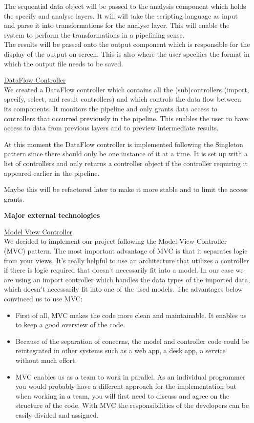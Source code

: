 \documentclass[a4paper,english,fleqn]{exam}
\begin{document}
The sequential data object will be passed to the analysis component which holds the specify and analyse layers. It will will take the scripting language as input and parse it into transformations for the analyse layer. This will enable the system to perform the transformations in a pipelining sense. \\

The results will be passed onto the output component which is responsible for the display of the output on screen.  This is also where the user specifies the format in which the output file needs to be saved. 

\underline{DataFlow Controller} \\
We created a DataFlow controller which contains all the (sub)controllers (import, specify, select, and result controllers) and which controls the data flow between its components. It monitors the pipeline and only grants data access to controllers that occurred previously in the pipeline. This enables the user to have access to data from previous layers and to preview intermediate results. 

At this moment the DataFlow controller is implemented following the Singleton pattern since there should only be one instance of it at a time. It is set up with a list of controllers and only returns a controller object if the controller requiring it appeared earlier in the pipeline. 

Maybe this will be refactored later to make it more stable and to limit the access grants. 



\newpage
\textbf{Major external technologies}


\underline{Model View Controller} \\

We decided to implement our project following the Model View Controller (MVC) pattern. The most important advantage of MVC is that it separates logic from your views. It's really helpful to use an architecture that utilizes a controller if there is logic required that doesn't necessarily fit into a model. In our case we are using an import controller which handles the data types of the imported data, which doesn't necessarily fit into one of the used models. The advantages below convinced us to use MVC:

\begin{itemize}
\item First of all, MVC makes the code more clean and maintainable. It enables us to keep a good overview of the code.

\item Because of the separation of concerns, the model and controller code could be reintegrated in other systems such as a web app, a desk app, a service without much effort.

\item MVC enables us as a team to work in parallel. As an individual programmer you would probably have a different approach for the implementation but when working in a team, you will first need to discuss and agree on the structure of the code. With MVC the responsibilities of the developers can be easily divided and assigned.
\end{itemize}
\end{document}
